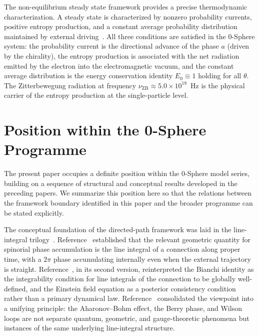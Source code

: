 \documentclass[%
 reprint, amsmath,amssymb, aps, prb, ]{revtex4-2}
\numberwithin{equation}{section}
\begin{document}
The non-equilibrium steady state framework provides a precise thermodynamic characterization. A steady state is characterized by nonzero probability currents, positive entropy production, and a constant average probability distribution maintained by external driving~\cite{Zeh2007}. All three conditions are satisfied in the 0-Sphere system: the probability current is the directional advance of the phase $a$ (driven by the chirality), the entropy production is associated with the net radiation emitted by the electron into the electromagnetic vacuum, and the constant average distribution is the energy conservation identity $E_0 \equiv 1$ holding for all $\theta$. The Zitterbewegung radiation at frequency $\nu_{\mathrm{ZB}} \approx 5.0 \times 10^{18}$~Hz is the physical carrier of the entropy production at the single-particle level.


\section{Position within the 0-Sphere Programme}
\label{sec:position}

The present paper occupies a definite position within the 0-Sphere model series, building on a sequence of structural and conceptual results developed in the preceding papers. We summarize this position here so that the relations between the framework boundary identified in this paper and the broader programme can be stated explicitly.

The conceptual foundation of the directed-path framework was laid in the line-integral trilogy~\cite{hanamura29, hanamura30, hanamura31}. Reference~\cite{hanamura29} established that the relevant geometric quantity for spinorial phase accumulation is the line integral of a connection along proper time, with a $2\pi$ phase accumulating internally even when the external trajectory is straight. Reference~\cite{hanamura30}, in its second version, reinterpreted the Bianchi identity as the integrability condition for line integrals of the connection to be globally well-defined, and the Einstein field equation as a posterior consistency condition rather than a primary dynamical law. Reference~\cite{hanamura31} consolidated the viewpoint into a unifying principle: the Aharonov--Bohm effect, the Berry phase, and Wilson loops are not separate quantum, geometric, and gauge-theoretic phenomena but instances of the same underlying line-integral structure.
\end{document}
